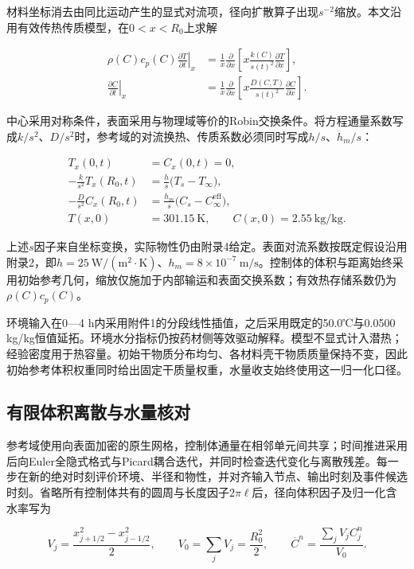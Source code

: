 材料坐标消去由同比运动产生的显式对流项，径向扩散算子出现$s^{-2}$缩放。本文沿用有效传热传质模型，在$0<x<R_0$上求解

\[
\begin{aligned}\rho(C)c_p(C)\left.\frac{\partial T}{\partial t}\right|_x&=\frac1x\frac{\partial}{\partial x}\left[x\frac{k(C)}{s(t)^2}\frac{\partial T}{\partial x}\right],\\ \left.\frac{\partial C}{\partial t}\right|_x&=\frac1x\frac{\partial}{\partial x}\left[x\frac{D(C,T)}{s(t)^2}\frac{\partial C}{\partial x}\right].\end{aligned}
\]

中心采用对称条件，表面采用与物理域等价的Robin交换条件。将方程通量系数写成$k/s^2$、$D/s^2$时，参考域的对流换热、传质系数必须同时写成$h/s$、$h_m/s$：

\[
\begin{aligned}T_x(0,t)&=C_x(0,t)=0,\\ -\frac{k}{s^2}T_x(R_0,t)&=\frac{h}{s}\bigl(T_s-T_\infty\bigr),\\ -\frac{D}{s^2}C_x(R_0,t)&=\frac{h_m}{s}\bigl(C_s-C_\infty^{\mathrm{eff}}\bigr),\\ T(x,0)&=301.15\ \mathrm{K},\qquad C(x,0)=2.55\ \mathrm{kg/kg}.\end{aligned}
\]

上述$s$因子来自坐标变换，实际物性仍由附录4给定。表面对流系数按既定假设沿用附录2，即$h=25\ \mathrm{W/(m^2\cdot K)}$、$h_m=8\times10^{-7}\ \mathrm{m/s}$。控制体的体积与距离始终采用初始参考几何，缩放仅施加于内部输运和表面交换系数；有效热存储系数仍为$\rho(C)c_p(C)$。

环境输入在0—4 h内采用附件1的分段线性插值，之后采用既定的50.0℃与0.0500 kg/kg恒值延拓。环境水分指标仍按药材侧等效驱动解释。模型不显式计入潜热；经验密度用于热容量。初始干物质分布均匀、各材料壳干物质质量保持不变，因此初始参考体积权重同时给出固定干质量权重，水量收支始终使用这一归一化口径。

\subsection{有限体积离散与水量核对}

参考域使用向表面加密的原生网格，控制体通量在相邻单元间共享；时间推进采用后向Euler全隐式格式与Picard耦合迭代，并同时检查迭代变化与离散残差。每一步在新的绝对时刻评价环境、半径和物性，并对齐输入节点、输出时刻及事件候选时刻。省略所有控制体共有的圆周与长度因子$2\pi\ell$后，径向体积因子及归一化含水率写为

\[
V_j=\frac{x_{j+1/2}^2-x_{j-1/2}^2}{2},\qquad V_0=\sum_jV_j=\frac{R_0^2}{2},\qquad \overline C^n=\frac{\sum_jV_j C_j^n}{V_0}.
\]

